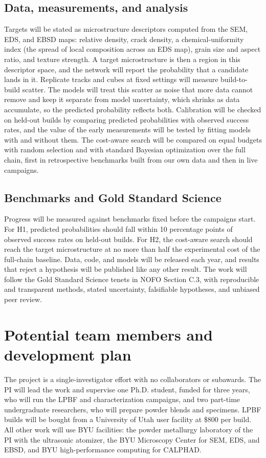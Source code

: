 \documentclass[12pt,letterpaper]{article}
\begin{document}
\subsection{Data, measurements, and analysis}
Targets will be stated as microstructure descriptors computed from the SEM,
EDS, and EBSD maps: relative density, crack density, a chemical-uniformity
index (the spread of local composition across an EDS map), grain size and
aspect ratio, and texture strength. A target microstructure is then a region
in this descriptor space, and the network will report the probability that a
candidate lands in it. Replicate tracks and cubes at fixed settings will
measure build-to-build scatter. The models will treat this scatter as noise
that more data cannot remove and keep it separate from model uncertainty,
which shrinks as data accumulate, so the predicted probability reflects both.
Calibration will be checked on held-out builds by comparing predicted
probabilities with observed success rates, and the value of the early
measurements will be tested by fitting models with and without them. The
cost-aware search will be compared on equal budgets with random selection and
with standard Bayesian optimization over the full chain, first in
retrospective benchmarks built from our own data and then in live campaigns.

\subsection{Benchmarks and Gold Standard Science}
Progress will be measured against benchmarks fixed before the campaigns
start. For H1, predicted probabilities should fall within 10 percentage points
of observed success rates on held-out builds. For H2, the cost-aware search
should reach the target microstructure at no more than half the experimental
cost of the full-chain baseline. Data, code, and models will be released each
year, and results that reject a hypothesis will be published like any other
result. The work will follow the Gold Standard Science tenets in NOFO
Section C.3, with reproducible and transparent methods, stated uncertainty,
falsifiable hypotheses, and unbiased peer review.

\section{Potential team members and development plan}

The project is a single-investigator effort with no collaborators or
subawards. The PI will lead the work and supervise one Ph.D. student, funded
for three years, who will run the LPBF and characterization campaigns, and two
part-time undergraduate researchers, who will prepare powder blends and
specimens. LPBF builds will be bought from a University of Utah user
facility at \$800 per build. All other work will use BYU facilities: the
powder metallurgy laboratory of the PI with the ultrasonic atomizer, the BYU
Microscopy Center for SEM, EDS, and EBSD, and BYU high-performance computing
for CALPHAD.
\end{document}

